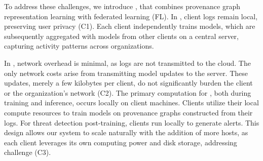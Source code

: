 


To address these challenges, we introduce \Sys, that combines provenance graph representation learning with federated learning (FL). In \Sys, client logs remain local, preserving user privacy (C1). Each client independently trains \gnnshort models, which are subsequently aggregated with models from other clients on a central server, capturing activity patterns across organizations.

In \Sys, network overhead is minimal, as logs are not transmitted to the cloud. The only network costs arise from transmitting model updates to the server. These updates, merely a few kilobytes per client, do not significantly burden the client or the organization's network (C2). The primary computation for \Sys, both during training and inference, occurs locally on client machines. Clients utilize their local compute resources to train models on provenance graphs constructed from their logs. For threat detection post-training, clients run \Sys locally to generate alerts. This design allows our system to scale naturally with the addition of more hosts, as each client leverages its own computing power and disk storage, addressing challenge (C3).




